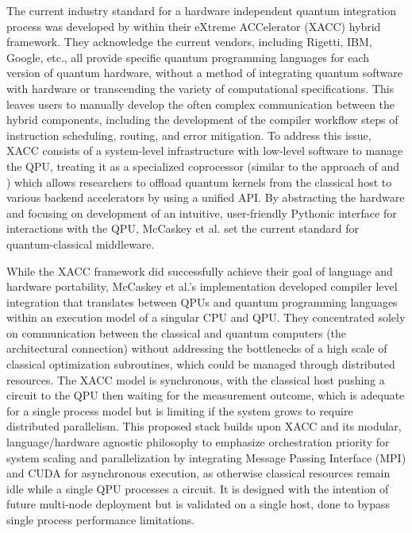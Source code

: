 The current industry standard for a hardware independent quantum integration process was developed by \textcite{mccaskey2018xacc} 
within their eXtreme ACCelerator (XACC) hybrid framework. They acknowledge the current vendors, including Rigetti,
IBM, Google, etc., all provide specific quantum programming languages for each version of quantum hardware, without 
a method of integrating quantum software with hardware or transcending the variety of computational specifications. This leaves users to manually develop the 
often complex communication between the hybrid components, including the development of the compiler workflow steps of instruction scheduling, routing, and error mitigation. 
To address this issue, XACC consists of a system-level infrastructure with low-level software to manage the QPU, treating it as a specialized 
coprocessor (similar to the approach of \textcite{peruzzo2014variational} and \textcite{rallis2025interfacingquantumcomputingsystems}) which allows researchers to offload 
quantum kernels from the classical host to various backend accelerators by using a unified API. By abstracting the hardware and focusing on
development of an intuitive, user-friendly Pythonic interface for interactions with the QPU, McCaskey et al. set the current standard for quantum-classical middleware.  

While the XACC framework did successfully achieve their goal of language and hardware portability, McCaskey et al.'s implementation 
developed compiler level integration that translates between QPUs and quantum programming languages within an execution model of a singular CPU and QPU. 
They concentrated solely on communication between the classical and quantum computers (the architectural connection) without addressing the bottlenecks of a high scale of 
classical optimization subroutines, which could be managed through distributed resources. The XACC model is synchronous, with the  
classical host pushing a circuit to the QPU then waiting for the measurement outcome, which is adequate for a single process model 
but is limiting if the system grows to require distributed parallelism. This proposed stack builds 
upon XACC and its modular, language/hardware agnostic philosophy to emphasize orchestration priority for system scaling and parallelization by 
integrating Message Passing Interface (MPI) and CUDA for asynchronous execution, as otherwise classical resources remain idle while a single QPU processes a circuit. 
It is designed with the intention of future multi-node deployment but is validated on a single host, done to bypass single process performance limitations. 

